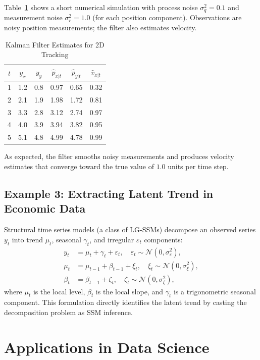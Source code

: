\documentclass[conference]{IEEEtran}
\begin{document}
Table~\ref{tab:tracking} shows a short numerical simulation with process noise $\sigma_q^2 = 0.1$ and measurement noise $\sigma_r^2 = 1.0$ (for each position component). Observations are noisy position measurements; the filter also estimates velocity.

\begin{table}[htbp]
\centering
\caption{Kalman Filter Estimates for 2D Tracking}
\label{tab:tracking}
\begin{tabular}{cccccc}
\toprule
$t$ & $y_{x}$ & $y_{y}$ & $\hat{p}_{x|t}$ & $\hat{p}_{y|t}$ & $\hat{v}_{x|t}$ \\
\midrule
1 & 1.2 & 0.8 & 0.97 & 0.65 & 0.32 \\
2 & 2.1 & 1.9 & 1.98 & 1.72 & 0.81 \\
3 & 3.3 & 2.8 & 3.12 & 2.74 & 0.97 \\
4 & 4.0 & 3.9 & 3.94 & 3.82 & 0.95 \\
5 & 5.1 & 4.8 & 4.99 & 4.78 & 0.99 \\
\bottomrule
\end{tabular}
\end{table}

As expected, the filter smooths noisy measurements and produces velocity estimates that converge toward the true value of $1.0$ units per time step.

\subsection{Example 3: Extracting Latent Trend in Economic Data}

Structural time series models (a class of LG-SSMs) decompose an observed series $y_t$ into trend $\mu_t$, seasonal $\gamma_t$, and irregular $\varepsilon_t$ components:
\begin{align}
y_t &= \mu_t + \gamma_t + \varepsilon_t, \quad \varepsilon_t \sim \mathcal{N}(0, \sigma_\varepsilon^2), \\
\mu_t &= \mu_{t-1} + \beta_{t-1} + \xi_t, \quad \xi_t \sim \mathcal{N}(0, \sigma_\xi^2), \\
\beta_t &= \beta_{t-1} + \zeta_t, \quad \zeta_t \sim \mathcal{N}(0, \sigma_\zeta^2),
\end{align}
where $\mu_t$ is the local level, $\beta_t$ is the local slope, and $\gamma_t$ is a trigonometric seasonal component. This formulation directly identifies the latent trend by casting the decomposition problem as SSM inference.

\section{Applications in Data Science}
\label{sec:applications}
\end{document}
